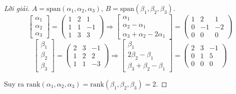 \documentclass[class=linearalgebra,crop=false]{standalone}
\begin{document}
\begin{proof}[Lời giải]$A = \text{span}(\alpha_{1},\alpha_{2},\alpha_{3})$, $B = \text{span}(\beta_{1},\beta_{2},\beta_{3})$.
    \[
        \begin{bmatrix}
            \alpha_{1} \\
            \alpha_{2} \\
            \alpha_{3}
        \end{bmatrix}=
        \begin{pmatrix}
            1 & 2 & 1 \\
            1 & 1 & -1 \\
            1 & 3 & 3
        \end{pmatrix}
        \Longrightarrow
        \begin{bmatrix}
            \alpha_{1} \\
            \alpha_{2}-\alpha_{1} \\
            \alpha_{3}+\alpha_{2}-2\alpha_{1}
        \end{bmatrix}=
        \begin{pmatrix}
            1 & 2 & 1 \\
            0 & -1 & -2 \\
            0 & 0 & 0
        \end{pmatrix}
    \]
    \[
        \begin{bmatrix}
            \beta_{1} \\
            \beta_{2} \\
            \beta_{3}
        \end{bmatrix}=
        \begin{pmatrix}
            2 & 3 & -1 \\
            1 & 2 & 2 \\
            1 & 1 & -3
        \end{pmatrix}
        \Longrightarrow
        \begin{bmatrix}
            \beta_{1} \\
            2\beta_{2}-\beta_{1} \\
            \beta_{3}+\beta_{2}-\beta_{1}
        \end{bmatrix}=
        \begin{pmatrix}
            2 & 3 & -1 \\
            0 & 1 & 5 \\
            0 & 0 & 0
        \end{pmatrix}
    \]
    \par Suy ra $\text{rank}(\alpha_{1},\alpha_{2},\alpha_{3}) = \text{rank}(\beta_{1},\beta_{2},\beta_{3}) = 2$.

\end{proof}
\end{document}
